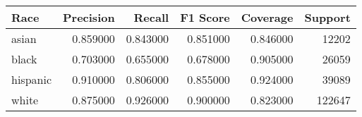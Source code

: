 \begin{tabular}{lrrrrr}
\toprule
Race & Precision & Recall & F1 Score & Coverage & Support \\
\midrule
asian & 0.859000 & 0.843000 & 0.851000 & 0.846000 & 12202 \\
black & 0.703000 & 0.655000 & 0.678000 & 0.905000 & 26059 \\
hispanic & 0.910000 & 0.806000 & 0.855000 & 0.924000 & 39089 \\
white & 0.875000 & 0.926000 & 0.900000 & 0.823000 & 122647 \\
\bottomrule
\end{tabular}
